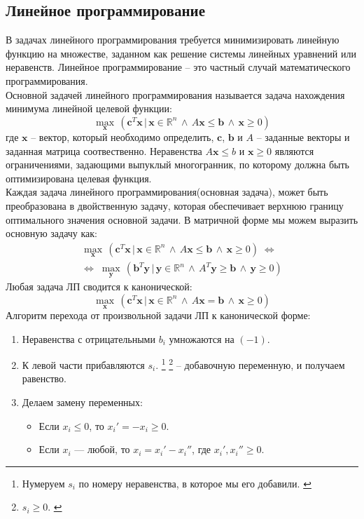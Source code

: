\documentclass[a4paper,14pt]{article}
\theoremstyle{plain}
\theoremstyle{definition}
\theoremstyle{remark}
\newcommand{\nl}{\\ \indent}
\begin{document}
\subsection{Линейное программирование}
В задачах линейного программирования требуется минимизировать
линейную функцию на множестве, заданном как решение системы
линейных уравнений или неравенств. 
Линейное программирование 
-- это частный случай математического программирования.
\nl
Основной задачей линейного программирования называется задача
нахождения минимума линейной целевой функции:
\begin{equation}
\max\limits_{\pmb x} \, 
(\pmb c^T \pmb x \, | \, \pmb x \in \mathbb{R}^n
\, \wedge \, A \pmb x \leq \pmb b \, \wedge \, \pmb x \geq 0)
\end{equation}
где $\pmb x$ -- вектор, который необходимо определить,
$\pmb c$, $\pmb b$ и $A$ -- заданные векторы и заданная
матрица соотвественно.
Неравенства $A \pmb x \leq b$ и $\pmb x \geq 0$ являются
ограничениями, задающими выпуклый многогранник, по которому
должна быть оптимизирована целевая функция.
\nl
Каждая задача линейного программирования(основная задача), 
может быть преобразована в двойственную задачу, 
которая обеспечивает  верхнюю границу оптимального 
значения основной задачи. 
В матричной форме мы можем выразить основную задачу как:
\begin{multline}
\max\limits_{\pmb x} \, 
(\pmb c^T \pmb x \, | \, \pmb x \in \mathbb{R}^n
\, \wedge \, A \pmb x \leq \pmb b \, \wedge \, \pmb x \geq 0)
\; \Leftrightarrow \\
\Leftrightarrow \;
\max\limits_{\pmb y} \, 
(\pmb b^T \pmb y \, | \, \pmb y \in \mathbb{R}^n
\, \wedge \, A^T \pmb y \geq \pmb b \, \wedge \, \pmb y \geq 0)
\end{multline}
Любая задача ЛП сводится к канонической:
\begin{equation}
\max\limits_{\pmb x} \, 
(\pmb c^T \pmb x \, | \, \pmb x \in \mathbb{R}^n
\, \wedge \, A \pmb x = \pmb b \, \wedge \, \pmb x \geq 0)
\end{equation}
Алгоритм перехода от произвольной задачи ЛП к канонической форме:
\begin{enumerate}
\item Неравенства с отрицательными $b_i$ 
умножаются на $(-1)$.
\item К левой части прибавляются $s_i$.
\footnote{Нумеруем $s_i$ по номеру неравенства, 
в которое мы его добавили.
\label{note:s1}}
\footnote{$s_i \geq 0$.
\label{note:s2}} -- добавочную переменную, 
и получаем равенство.
\item Делаем замену переменных:
\begin{itemize}
\item Если $x_i \leq 0$, то $x_i'= -x_i \geq 0$.
\item Если $x_i$ — любой, то $x_i= x_i' - x_i''$, где 
$x_i', x_i''\geq 0$.
\end{itemize}
\end{enumerate}
\end{document}
